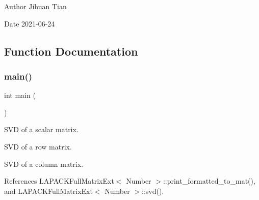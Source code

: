 \begin{DoxyAuthor}{Author}
Jihuan Tian 
\end{DoxyAuthor}
\begin{DoxyDate}{Date}
2021-\/06-\/24 
\end{DoxyDate}


\subsection{Function Documentation}
\mbox{\label{svd-degenerate-cases_8cc_ae66f6b31b5ad750f1fe042a706a4e3d4}} 
\subsubsection{\texorpdfstring{main()}{main()}}
{\footnotesize\ttfamily int main (\begin{DoxyParamCaption}{ }\end{DoxyParamCaption})}

S\+VD of a scalar matrix.

S\+VD of a row matrix.

S\+VD of a column matrix.

References L\+A\+P\+A\+C\+K\+Full\+Matrix\+Ext$<$ Number $>$\+::print\+\_\+formatted\+\_\+to\+\_\+mat(), and L\+A\+P\+A\+C\+K\+Full\+Matrix\+Ext$<$ Number $>$\+::svd().

